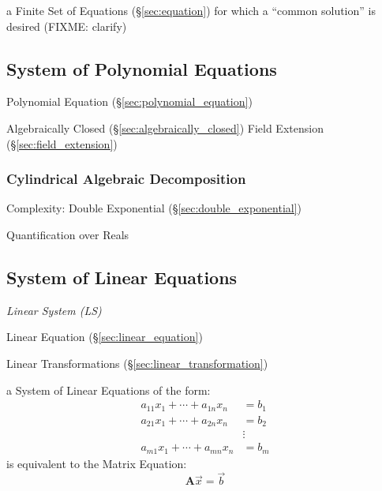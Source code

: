 a Finite Set of Equations (\S\ref{sec:equation}) for which a ``common
solution'' is desired (FIXME: clarify)



\subsection{System of Polynomial Equations}
\label{sec:system_of_polynomials}

Polynomial Equation (\S\ref{sec:polynomial_equation})

Algebraically Closed (\S\ref{sec:algebraically_closed}) Field
Extension (\S\ref{sec:field_extension})



\subsubsection{Cylindrical Algebraic Decomposition}
\label{sec:algebraic_decomposition}

Complexity: Double Exponential (\S\ref{sec:double_exponential})

Quantification over Reals



\subsection{System of Linear Equations}
\label{sec:system_of_linear_equations}

\emph{Linear System (LS)}

Linear Equation (\S\ref{sec:linear_equation})

\fist Linear Transformations (\S\ref{sec:linear_transformation})

a System of Linear Equations of the form:
\begin{align*}
  a_{11}x_1 + \cdots + a_{1n}x_n & = b_1 \\
  a_{21}x_1 + \cdots + a_{2n}x_n & = b_2 \\
                                 & \vdots \\
  a_{m1}x_1 + \cdots + a_{mn}x_n & = b_m
\end{align*}
is equivalent to the Matrix Equation:
\[
  \mathbf{A}\vec{x} = \vec{b}
\]

